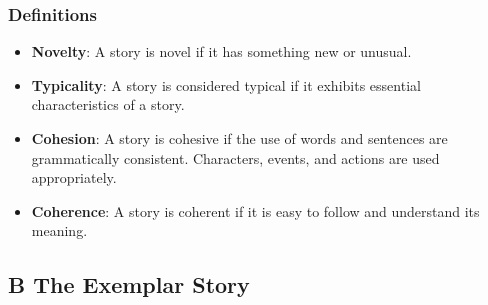\documentclass[a4paper]{article}
\begin{document}
\subsubsection{Definitions}
\begin{itemize}
\item \textbf{Novelty}: A story is novel if it has something new or unusual. 
\item \textbf{Typicality}: A story is considered typical if it exhibits essential characteristics of a story.
\item \textbf{Cohesion}: A story is cohesive if the use of words and sentences are grammatically consistent. Characters, events, and actions are used appropriately.
\item \textbf{Coherence}: A story is coherent if it is easy to follow and understand its meaning.
\end{itemize}
\vfill

\newpage
\subsection{B The Exemplar Story}\label{app:exemplar-story}
\end{document}
